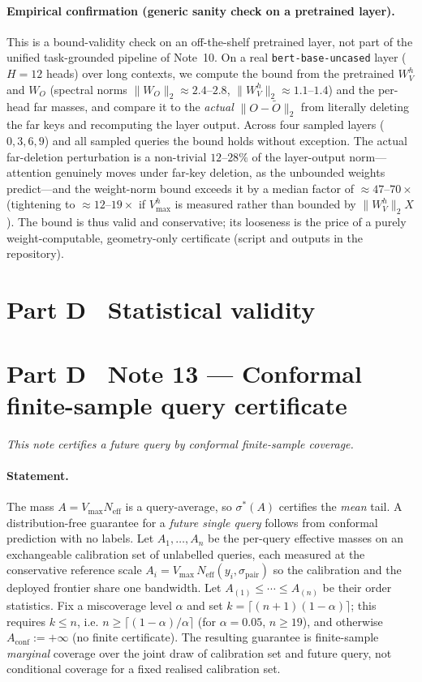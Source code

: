 \documentclass[10pt,twocolumn]{article}
\newcommand{\sstar}{\sigma^{*}}
\newcommand{\Neff}{N_{\mathrm{eff}}}
\begin{document}
\paragraph{Empirical confirmation (generic sanity check on a pretrained layer).} This is a bound-validity check on an off-the-shelf pretrained layer, not part of the unified task-grounded pipeline of Note~10. On a real \texttt{bert-base-uncased} layer ($H=12$ heads) over long contexts, we compute the bound from the pretrained $W_V^h$ and $W_O$ (spectral norms $\lVert W_O\rVert_2\approx 2.4$--$2.8$, $\lVert W_V^h\rVert_2\approx 1.1$--$1.4$) and the per-head far masses, and compare it to the \emph{actual} $\lVert O-\tilde O\rVert_2$ from literally deleting the far keys and recomputing the layer output. Across four sampled layers ($0,3,6,9$) and all sampled queries the bound holds without exception. The actual far-deletion perturbation is a non-trivial $12$--$28\%$ of the layer-output norm---attention genuinely moves under far-key deletion, as the unbounded weights predict---and the weight-norm bound exceeds it by a median factor of $\approx\!47$--$70\times$ (tightening to $\approx\!12$--$19\times$ if $V^h_{\max}$ is measured rather than bounded by $\lVert W_V^h\rVert_2 X$). The bound is thus valid and conservative; its looseness is the price of a purely weight-computable, geometry-only certificate (script and outputs in the repository).

\FloatBarrier
\section*{Part D \textperiodcentered\ Statistical validity}

\section*{Part D \textperiodcentered\ Note 13 --- Conformal finite-sample query certificate}
\label{si:conformal}
\emph{This note certifies a future query by conformal finite-sample coverage.}
\paragraph{Statement.} The mass $A=V_{\max}\Neff$ is a query-average, so $\sstar(A)$ certifies the \emph{mean} tail. A distribution-free guarantee for a \emph{future single query} follows from conformal prediction with no labels. Let $A_1,\dots,A_n$ be the per-query effective masses on an exchangeable calibration set of unlabelled queries, each measured at the conservative reference scale $A_i=V_{\max}\,\Neff(y_i,\sigma_{\mathrm{pair}})$ so the calibration and the deployed frontier share one bandwidth. Let $A_{(1)}\le\cdots\le A_{(n)}$ be their order statistics. Fix a miscoverage level $\alpha$ and set $k=\lceil(n+1)(1-\alpha)\rceil$; this requires $k\le n$, i.e. $n\ge\lceil(1-\alpha)/\alpha\rceil$ (for $\alpha=0.05$, $n\ge19$), and otherwise $A_{\mathrm{conf}}:=+\infty$ (no finite certificate). The resulting guarantee is finite-sample \emph{marginal} coverage over the joint draw of calibration set and future query, not conditional coverage for a fixed realised calibration set.
\end{document}
